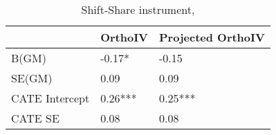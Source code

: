 \begin{table}\centering\caption{Shift-Share instrument, }\begin{tabular}{lll}
\toprule
                & OrthoIV   & Projected OrthoIV   \\
\midrule
 B(GM)          & -0.17*    & -0.15               \\
 SE(GM)         & 0.09      & 0.09                \\
 CATE Intercept & 0.26***   & 0.25***             \\
 CATE SE        & 0.08      & 0.08                \\
\bottomrule
\end{tabular}\end{table}